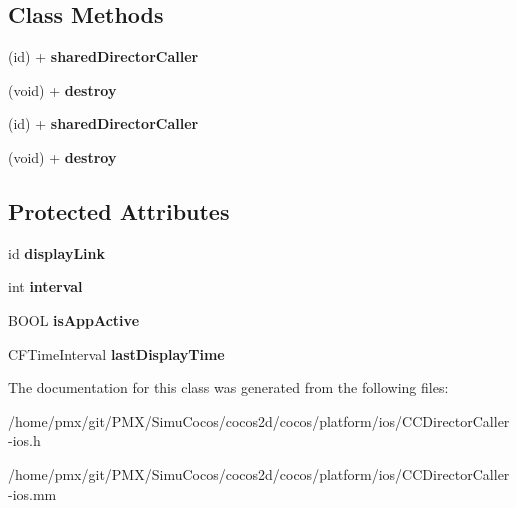\subsection*{Class Methods}
\begin{DoxyCompactItemize}
\item 
\mbox{\label{interfaceCCDirectorCaller_a8527e1ebe5e20b255411d625da3940c4}} 
(id) + {\bfseries shared\+Director\+Caller}
\item 
\mbox{\label{interfaceCCDirectorCaller_a2d4ab244a2b3da16481e2616f1acf766}} 
(void) + {\bfseries destroy}
\item 
\mbox{\label{interfaceCCDirectorCaller_a8527e1ebe5e20b255411d625da3940c4}} 
(id) + {\bfseries shared\+Director\+Caller}
\item 
\mbox{\label{interfaceCCDirectorCaller_a2d4ab244a2b3da16481e2616f1acf766}} 
(void) + {\bfseries destroy}
\end{DoxyCompactItemize}
\subsection*{Protected Attributes}
\begin{DoxyCompactItemize}
\item 
\mbox{\label{interfaceCCDirectorCaller_a2bf38026c7f130317ec7138a9fe29db0}} 
id {\bfseries display\+Link}
\item 
\mbox{\label{interfaceCCDirectorCaller_a6a971d201460d1b2ade801074cc2039b}} 
int {\bfseries interval}
\item 
\mbox{\label{interfaceCCDirectorCaller_ab3239fd97b9082daae50a2955ed32aaa}} 
B\+O\+OL {\bfseries is\+App\+Active}
\item 
\mbox{\label{interfaceCCDirectorCaller_a24ec96da12a71e0b319e0583eb5fd86e}} 
C\+F\+Time\+Interval {\bfseries last\+Display\+Time}
\end{DoxyCompactItemize}


The documentation for this class was generated from the following files\+:\begin{DoxyCompactItemize}
\item 
/home/pmx/git/\+P\+M\+X/\+Simu\+Cocos/cocos2d/cocos/platform/ios/C\+C\+Director\+Caller-\/ios.\+h\item 
/home/pmx/git/\+P\+M\+X/\+Simu\+Cocos/cocos2d/cocos/platform/ios/C\+C\+Director\+Caller-\/ios.\+mm\end{DoxyCompactItemize}
